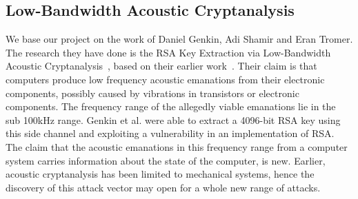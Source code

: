 \subsection{Low-Bandwidth Acoustic Cryptanalysis}\label{chp2:subsec:original_research}
We base our project on the work of Daniel Genkin, Adi Shamir and Eran Tromer.
The research they have done is the RSA Key Extraction via Low-Bandwidth Acoustic Cryptanalysis~\cite{DBLP:conf/crypto/GenkinST14}, based on their earlier work~\cite{tromer2004acoustic, tromer2007hardware}.
Their claim is that computers produce low frequency acoustic emanations from their electronic components, possibly caused by vibrations in transistors or electronic components.
The frequency range of the allegedly viable emanations lie in the sub 100kHz range.
Genkin et al. were able to extract a 4096-bit RSA key using this side channel and exploiting a vulnerability in an implementation of RSA.
The claim that the acoustic emanations in this frequency range from a computer system carries information about the state of the computer, is new.
Earlier, acoustic cryptanalysis has been limited to mechanical systems, hence the discovery of this attack vector may open for a whole new range of attacks.
